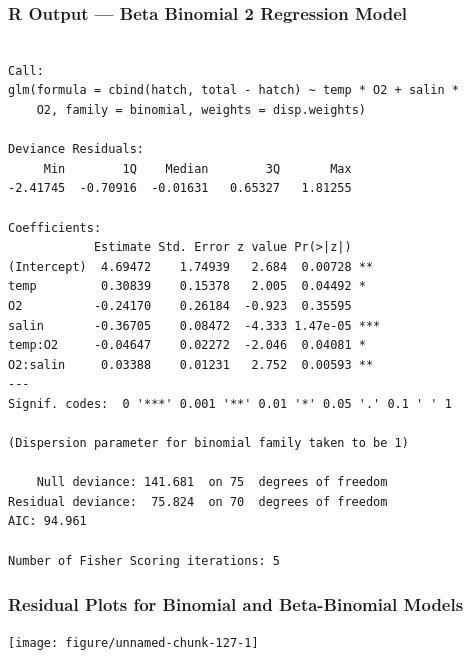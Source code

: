 \documentclass[oneside]{book}\usepackage[]{graphicx}\usepackage[svgnames]{xcolor}
\makeatletter
\newenvironment{kframe}{%
 \def\at@end@of@kframe{}%
 \ifinner\ifhmode%
  \def\at@end@of@kframe{\end{minipage}}%
  \begin{minipage}{\columnwidth}%
 \fi\fi%
 \def\FrameCommand##1{\hskip\@totalleftmargin \hskip-\fboxsep
 \colorbox{shadecolor}{##1}\hskip-\fboxsep
     \hskip-\linewidth \hskip-\@totalleftmargin \hskip\columnwidth}%
 \MakeFramed {\advance\hsize-\width
   \@totalleftmargin\z@ \linewidth\hsize
   \@setminipage}}%
 {\par\unskip\endMakeFramed%
 \at@end@of@kframe}
\newenvironment{knitrout}{}{} %
\makeatother
\begin{document}
\subsubsection*{R Output --- Beta Binomial 2 Regression Model}
\begin{knitrout}
\color{fgcolor}\begin{kframe}
\begin{verbatim}

Call:
glm(formula = cbind(hatch, total - hatch) ~ temp * O2 + salin * 
    O2, family = binomial, weights = disp.weights)

Deviance Residuals: 
     Min        1Q    Median        3Q       Max  
-2.41745  -0.70916  -0.01631   0.65327   1.81255  

Coefficients:
            Estimate Std. Error z value Pr(>|z|)    
(Intercept)  4.69472    1.74939   2.684  0.00728 ** 
temp         0.30839    0.15378   2.005  0.04492 *  
O2          -0.24170    0.26184  -0.923  0.35595    
salin       -0.36705    0.08472  -4.333 1.47e-05 ***
temp:O2     -0.04647    0.02272  -2.046  0.04081 *  
O2:salin     0.03388    0.01231   2.752  0.00593 ** 
---
Signif. codes:  0 '***' 0.001 '**' 0.01 '*' 0.05 '.' 0.1 ' ' 1

(Dispersion parameter for binomial family taken to be 1)

    Null deviance: 141.681  on 75  degrees of freedom
Residual deviance:  75.824  on 70  degrees of freedom
AIC: 94.961

Number of Fisher Scoring iterations: 5
\end{verbatim}
\end{kframe}
\end{knitrout}
\subsubsection*{Residual Plots for Binomial and Beta-Binomial Models}
\begin{knitrout}
\color{fgcolor}

{\centering \texttt{[image: figure/unnamed-chunk-127-1]} 

}


\end{knitrout}
\end{document}
